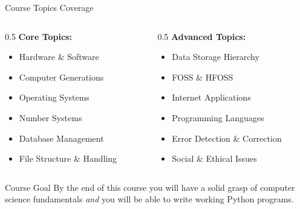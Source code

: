 \documentclass[aspectratio=169]{beamer}
\begin{document}
\begin{frame}{Course Topics Coverage}
  \begin{columns}[T]
    \begin{column}{0.5\textwidth}
      \textbf{Core Topics:}
      \begin{itemize}
        \item Hardware \& Software
        \item Computer Generations
        \item Operating Systems
        \item Number Systems
        \item Database Management
        \item File Structure \& Handling
      \end{itemize}
    \end{column}
    \begin{column}{0.5\textwidth}
      \textbf{Advanced Topics:}
      \begin{itemize}
        \item Data Storage Hierarchy
        \item FOSS \& HFOSS
        \item Internet Applications
        \item Programming Languages
        \item Error Detection \& Correction
        \item Social \& Ethical Issues
      \end{itemize}
    \end{column}
  \end{columns}
  \vspace{0.4cm}
  \begin{alertblock}{Course Goal}
    By the end of this course you will have a solid grasp of computer science
    fundamentals \emph{and} you will be able to write working Python programs.
  \end{alertblock}
\end{frame}
\end{document}
